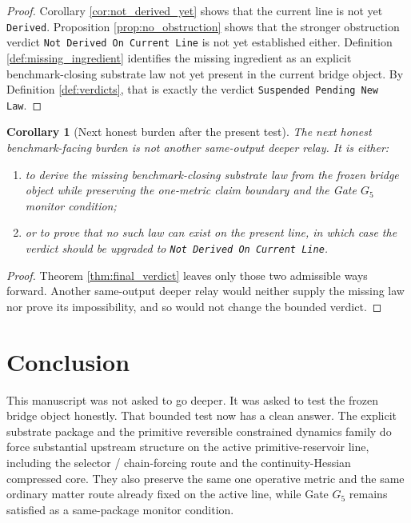 \documentclass[11pt]{article}
\newcommand{\GateFive}{G_{5}}
\newtheorem{corollary}{Corollary}
\begin{document}
\begin{proof}
Corollary \ref{cor:not_derived_yet} shows that the current line is not yet \texttt{Derived}. Proposition \ref{prop:no_obstruction} shows that the stronger obstruction verdict \texttt{Not Derived On Current Line} is not yet established either. Definition \ref{def:missing_ingredient} identifies the missing ingredient as an explicit benchmark-closing substrate law not yet present in the current bridge object. By Definition \ref{def:verdicts}, that is exactly the verdict \texttt{Suspended Pending New Law}.
\end{proof}

\begin{corollary}[Next honest burden after the present test]
The next honest benchmark-facing burden is not another same-output deeper relay. It is either:
\begin{enumerate}
    \item to derive the missing benchmark-closing substrate law from the frozen bridge object while preserving the one-metric claim boundary and the Gate \(\GateFive\) monitor condition;
    \item or to prove that no such law can exist on the present line, in which case the verdict should be upgraded to \texttt{Not Derived On Current Line}.
\end{enumerate}
\end{corollary}

\begin{proof}
Theorem \ref{thm:final_verdict} leaves only those two admissible ways forward. Another same-output deeper relay would neither supply the missing law nor prove its impossibility, and so would not change the bounded verdict.
\end{proof}

\section{Conclusion}

This manuscript was not asked to go deeper. It was asked to test the frozen bridge object honestly. That bounded test now has a clean answer. The explicit substrate package and the primitive reversible constrained dynamics family do force substantial upstream structure on the active primitive-reservoir line, including the selector / chain-forcing route and the continuity-Hessian compressed core. They also preserve the same one operative metric and the same ordinary matter route already fixed on the active line, while Gate \(\GateFive\) remains satisfied as a same-package monitor condition.
\end{document}
